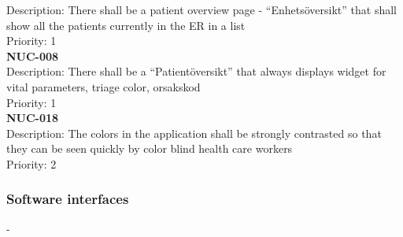 Description: There shall be a patient overview page - “Enhetsöversikt” that shall show all the patients currently in the ER in a list\\
Priority: 1 \\
\newline
\textbf{NUC-008} \\
Description: There shall be a “Patientöversikt” that always displays widget for vital parameters, triage color, orsakskod\\
Priority: 1 \\
\newline
\textbf{NUC-018} \\
Description: The colors in the application shall be strongly contrasted so that they can be seen quickly by color blind health care workers \\
Priority: 2 \\
\newline
\subsubsection{Software interfaces}
-
